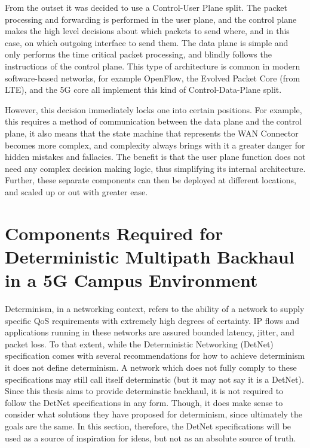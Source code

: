 From the outset it was decided to use a Control-User Plane split. The packet processing and forwarding is performed in the user plane, and the control plane makes the high level decisions about which packets to send where, and in this case, on which outgoing interface to send them. The data plane is simple and only performs the time critical packet processing, and blindly follows the instructions of the control plane. This type of architecture is common in modern software-based networks, for example OpenFlow, the Evolved Packet Core (from LTE), and the 5G core all implement this kind of Control-Data-Plane split.

However, this decision immediately locks one into certain positions. For example, this requires a method of communication between the data plane and the control plane, it also means that the state machine that represents the WAN Connector becomes more complex, and complexity always brings with it a greater danger for hidden mistakes and fallacies. The benefit is that the user plane function does not need any complex decision making logic, thus simplifying its internal architecture. Further, these separate components can then be deployed at different locations, and scaled up or out with greater ease.

\section{Components Required for Deterministic Multipath Backhaul in a 5G Campus Environment}
\label{sec:approach:comp}

Determinism, in a networking context, refers to the ability of a network to supply specific QoS requirements with extremely high degrees of certainty. IP flows and applications running in these networks are assured bounded latency, jitter, and packet loss. To that extent, while the Deterministic Networking (DetNet) specification comes with several recommendations for how to achieve determinism it does not define determinism. A network which does not fully comply to these specifications may still call itself determinstic (but it may not say it is a DetNet). Since this thesis aims to provide determinstic backhaul, it is not required to follow the DetNet specifications in any form. Though, it does make sense to consider what solutions they have proposed for determinism, since ultimately the goals are the same. In this section, therefore, the DetNet specifications will be used as a source of inspiration for ideas, but not as an absolute source of truth.

